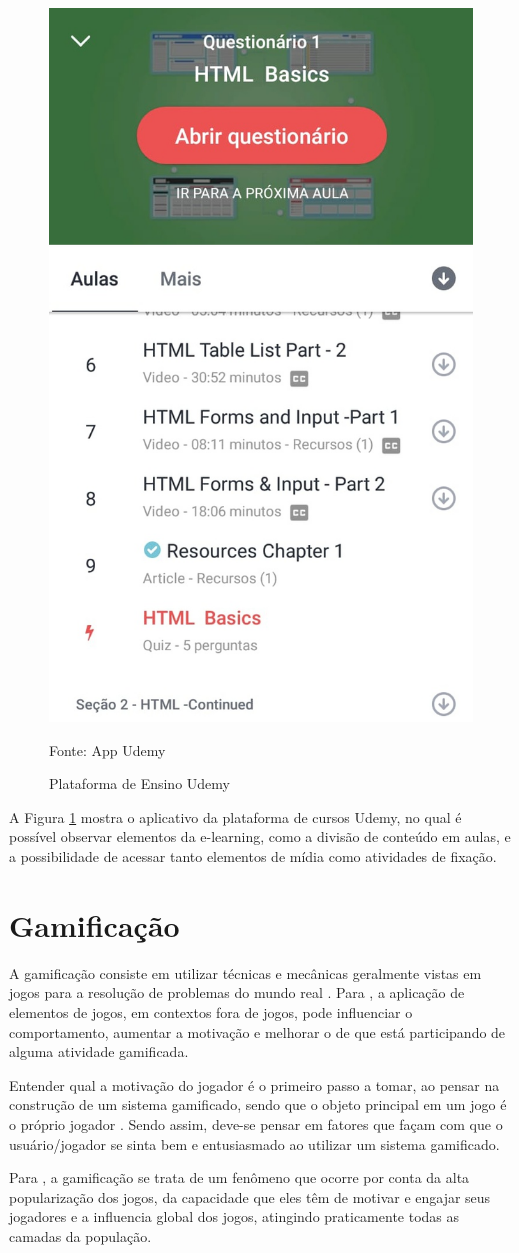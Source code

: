  		\begin{figure}[H]
 			\centering
 			\includegraphics[width=0.4\linewidth]{img/mlearningUdemy}
 			\caption{Plataforma de Ensino Udemy}
 			Fonte: App Udemy
 			\label{udemy}
 		\end{figure}
 			A Figura \ref{udemy} mostra o aplicativo da plataforma de cursos Udemy, no qual é possível observar elementos da e-learning, como a divisão de conteúdo em aulas, e a possibilidade de acessar tanto elementos de mídia como atividades de fixação.
 		
	\section{Gamificação}
	A gamificação consiste em utilizar técnicas e mecânicas geralmente vistas em jogos para a resolução de problemas do mundo real \cite{zichermann2011gamification}. Para \cite{marczewski2013gamification}, a aplicação de elementos de jogos, em contextos fora de jogos, pode influenciar o comportamento, aumentar a motivação e melhorar o de que está participando de alguma atividade gamificada.
	
	Entender qual a motivação do jogador é o primeiro passo a tomar, ao pensar na construção de um sistema gamificado, sendo que o objeto principal em um jogo é o próprio jogador \cite{zichermann2011gamification}. Sendo assim, deve-se pensar em fatores que façam com que o usuário/jogador se sinta bem e entusiasmado ao utilizar um sistema gamificado.
	
	Para , a gamificação se trata de um fenômeno que ocorre por conta da alta popularização dos jogos, da capacidade que eles têm de motivar e engajar seus jogadores e a influencia global dos jogos, atingindo praticamente todas as camadas da população. 
	
